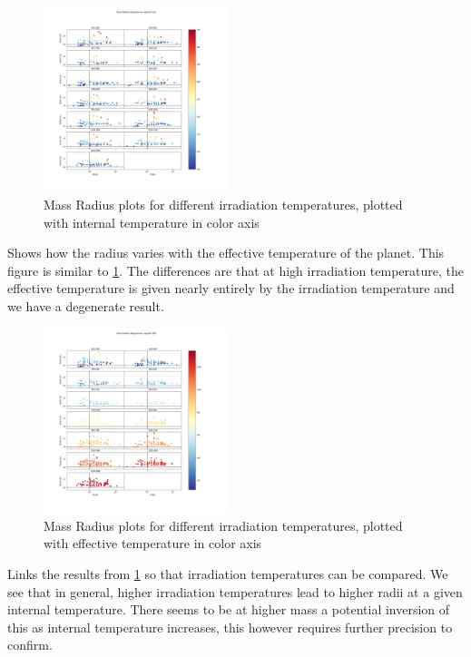 \begin{figure}
    \centering
    \includegraphics[width=0.48\textwidth]{Images/M_R_Tint.png}
    \caption{Mass Radius plots for different irradiation temperatures, plotted with internal temperature in color axis}
    \label{fig:M_R_Tint}
\end{figure}

 Shows how the radius varies with the effective temperature of the planet. This figure is similar to \cref{fig:M_R_Tint}. The differences are that at high irradiation temperature, the effective temperature is given nearly entirely by the irradiation temperature and we have a degenerate result. \par

\begin{figure}
    \centering
    \includegraphics[width=0.48\textwidth]{Images/M_R_Teff.png}
    \caption{Mass Radius plots for different irradiation temperatures, plotted with effective temperature in color axis}
    \label{fig:M_R_Teff}
\end{figure}

 Links the results from \cref{fig:M_R_Tint} so that irradiation temperatures can be compared. We see that in general, higher irradiation temperatures lead to higher radii at a given internal temperature. There seems to be at higher mass a potential inversion of this as internal temperature increases, this however requires further precision to confirm. \par

